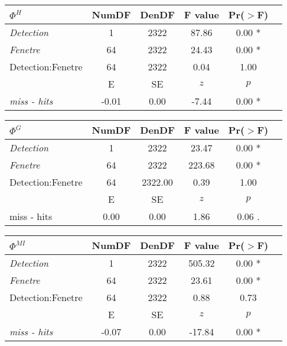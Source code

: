 \begin{table}
\begin{multicols}{2}
\vspace{0.5cm} 

\begin{tabular}{|l|*{5}{c|}}
\hline
\textbf{$\Phi^{H}$} & \textbf{NumDF} & \textbf{DenDF} & \textbf{F value} & \textbf{Pr($>$F)} \\ 
\hline
\textit{Detection} & 1 & 2322 & 87.86 & 0.00 * \\ 
\textit{Fenetre} & 64 & 2322 & 24.43 & 0.00 * \\ 
Detection:Fenetre & 64 & 2322 & 0.04 & 1.00 \\ 
\hline
& E & SE & $z$ & $p$ \\
\hline
\textit{miss - hits} & -0.01 & 0.00 & -7.44 & 0.00 * \\ 
\hline
\end{tabular}

\vspace{0.5cm}

\begin{tabular}{|l|*{5}{c|}}
\hline
\textbf{$\Phi^{G}$} & \textbf{NumDF} & \textbf{DenDF} & \textbf{F value} & \textbf{Pr($>$F)} \\ 
\hline
\textit{Detection} & 1 & 2322 & 23.47 & 0.00 * \\ 
\textit{Fenetre} & 64 & 2322 & 223.68 & 0.00 * \\ 
Detection:Fenetre & 64 & 2322.00 & 0.39 & 1.00 \\ 
\hline
& E & SE & $z$ & $p$ \\
\hline
miss - hits & 0.00 & 0.00 & 1.86 & 0.06 . \\ 
\hline
\end{tabular}

\vspace{0.5cm}

\begin{tabular}{|l|*{5}{c|}}
\hline
\textbf{$\Phi^{MI}$} & \textbf{NumDF} & \textbf{DenDF} & \textbf{F value} & \textbf{Pr($>$F)} \\ 
\hline
\textit{Detection} & 1 & 2322 & 505.32 & 0.00 * \\ 
\textit{Fenetre} & 64 & 2322 & 23.61 & 0.00 * \\ 
Detection:Fenetre & 64 & 2322 & 0.88 & 0.73 \\ 
\hline
& E & SE & $z$ & $p$ \\
\hline
\textit{miss - hits} & -0.07 & 0.00 & -17.84 & 0.00 * \\ 
\hline
\end{tabular}

\end{multicols}

\end{table}

